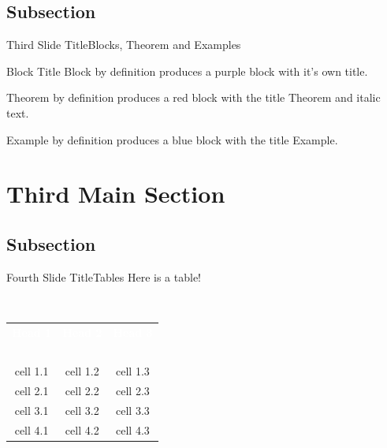 \documentclass[16pt]{beamer}
\begin{document}
\subsection{Subsection}

\begin{frame}{Third Slide Title}{Blocks, Theorem and Examples}
\begin{block}{Block Title}
Block by definition produces a purple block with it's own title.
\end{block}
\begin{theorem}
Theorem by definition produces a red block with the title Theorem and italic text.
\end{theorem}
\begin{example}
Example by definition produces a blue block with the title Example.
\end{example}
\end{frame}

\section{Third Main Section}

\subsection{Subsection}

\begin{frame}{Fourth Slide Title}{Tables}
Here is a table!

\begin{center}
\begin{minipage}{0.5\textwidth}
\begin{block}{~\vspace{0.6cm}}
\begin{center}
\vspace{-0.6cm}
\begin{tabular}{c c c}
 \textcolor{white}{\textbf{Head 1}} & \textcolor{white}{\textbf{Head 2}} & \textcolor{white}{\textbf{Head 3}} \\~\\
  cell 1.1 & cell 1.2 & cell 1.3\\ 
  cell 2.1 & cell 2.2 & cell 2.3\\
  cell 3.1 & cell 3.2 & cell 3.3\\
  cell 4.1 & cell 4.2 & cell 4.3
\end{tabular}
\end{center}
\end{block}
\end{minipage}
\end{center}

\end{frame}
\end{document}

